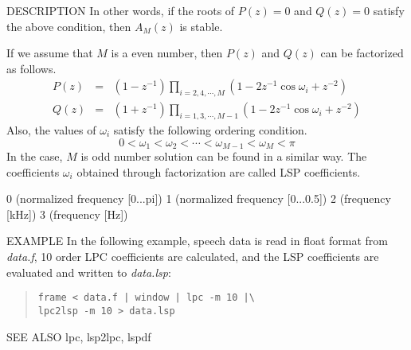 \begin{qsection}{DESCRIPTION}
In other words, if  the roots of $P(z)=0$ and $Q(z)=0$ satisfy the
above condition, then $A_M(z)$ is stable.
\par
If we assume that $M$ is a even number, then
$P(z)$ and $Q(z)$ can be factorized as follows.
\begin{eqnarray*}
  P(z) &=& ( 1 - z^{-1} ) \prod_{i=2,4,\cdots,M}
           ( 1 - 2 z^{-1} \cos \omega_i + z^{-2} ) \\
  Q(z) &=& ( 1 + z^{-1} ) \prod_{i=1,3,\cdots,M-1}
           ( 1 - 2 z^{-1} \cos \omega_i + z^{-2} )
\end{eqnarray*}
Also, the values of $\omega_i$ satisfy the following ordering condition.
\begin{displaymath}
  0 < \omega_1 < \omega_2 < \cdots < \omega_{M-1} < \omega_M < \pi
\end{displaymath}
In the case, $M$ is odd number solution can be found in a similar way.
The coefficients $\omega_i$ obtained through factorization are called
LSP coefficients.
\end{qsection}

\begin{options}
                 0 (normalized frequency [0...pi])
                 1 (normalized frequency [0...0.5])
                 2 (frequency [kHz])
                 3 (frequency [Hz])
\end{options}

\begin{qsection}{EXAMPLE}
In the following example, speech data is read in float format from
{\em data.f}, 10 order LPC coefficients are calculated,
and the LSP coefficients are evaluated and written to {\em data.lsp}:
\begin{quote}
\verb!frame < data.f | window | lpc -m 10 |\!\\
\verb!lpc2lsp -m 10 > data.lsp!
\end{quote}
\end{qsection}

\begin{qsection}{SEE ALSO}
lpc, lsp2lpc, lspdf
\end{qsection}
